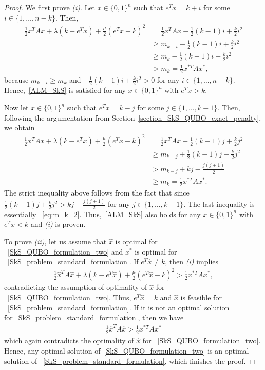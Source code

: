 \documentclass{article}
\begin{document}
\begin{proof}
We first prove {\it (i)}. Let $x \in \{0, 1\}^n$ such that $e^T x = k + i$ for some $i \in \{1, \ldots, n-k\}$. Then, 
\begin{align*}
\frac{1}{2}x^TAx + \lambda(k - e^Tx) + \frac{\mu}{2}(e^Tx - k)^2 &= \frac{1}{2}x^TAx - \frac{1}{2}(k-1) i + \frac{k}{2} i^2 \\
&\geq m_{k+i} - \frac{1}{2}(k-1) i + \frac{k}{2} i^2 \\
&\geq m_{k} - \frac{1}{2}(k-1) i + \frac{k}{2} i^2 \\
&> m_k = \frac{1}{2} x^{*T} A x^*,
\end{align*}
because $m_{k+i}\ge m_k$ and $- \frac{1}{2}(k-1) i + \frac{k}{2} i^2 > 0$ for any $i \in \{1, \ldots, n-k\}$. Hence,~\eqref{ALM_SkS} is satisfied for any $x \in \{0, 1\}^n$ with $e^T x > k$.

Now let $x \in \{0, 1\}^n$ such that $e^T x = k - j$ for some $j \in \{1, \ldots, k - 1\}$. Then, following the argumentation from Section~\ref{section_SkS_QUBO_exact_penalty}, we obtain
\begin{align*}
\frac{1}{2}x^TAx + \lambda(k - e^Tx) + \frac{\mu}{2}(e^Tx - k)^2 &= \frac{1}{2}x^TAx + \frac{1}{2}(k-1) j + \frac{k}{2} j^2 \\
&\geq m_{k-j} + \frac{1}{2}(k-1) j + \frac{k}{2} j^2 \\
&> m_{k-j} + kj - \frac{j(j+1)}{2} \\
&\geq m_k = \frac{1}{2} x^{*T} A x^*.
\end{align*}
The strict inequality above follows from the fact that
since $\frac{1}{2}(k-1) j + \frac{k}{2} j^2 > kj - \frac{j(j+1)}{2}$ for any $j \in \{1, \ldots, k - 1\}$. The last inequality is essentially ~\eqref{eq:m_k_2}.
Thus,~\eqref{ALM_SkS} also holds for any $x \in \{0, 1\}^n$ with $e^T x < k$ and {\it (i)} is proven.

To prove {\it (ii)}, let us assume that $\hat x$ is optimal for ~\eqref{SkS_QUBO_formulation_two} and $x^*$ is optimal for ~\eqref{SkS_problem_standard_formulation}. If $e^T\hat x\neq k$, then {\it (i)} implies
\begin{align*}
\frac{1}{2} \hat{x}^T A \hat{x} + \lambda(k - e^T\hat{x}) + \frac{\mu}{2}(e^T\hat{x} - k)^2 > \frac{1}{2} x^{*T} A x^*,
\end{align*}
contradicting the assumption of optimality of $\hat x$ for ~\eqref{SkS_QUBO_formulation_two}.
Thus, $e^T\hat{x} =  k$ and $\hat x$ is feasible for ~\eqref{SkS_problem_standard_formulation}.
If it is not an optimal solution for~\eqref{SkS_problem_standard_formulation}, then 
we have
\begin{align*}
\frac{1}{2} \hat x^T A \hat x > \frac{1}{2} x^{*T} A x^*
\end{align*}
which again contradicts the optimality  of $\hat x$ for ~\eqref{SkS_QUBO_formulation_two}. Hence, any optimal solution of~\eqref{SkS_QUBO_formulation_two} is an optimal solution of ~\eqref{SkS_problem_standard_formulation}, which finishes the proof.
\end{proof}
\end{document}
